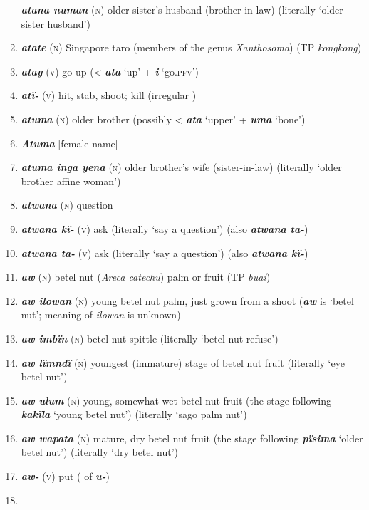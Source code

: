\begin{enumerate}[noitemsep, label={}, align=left, widest=190, labelsep=1ex,leftmargin=*,itemindent=-10pt]
\textbf{\textit{atana numan}} (\textsc{n}) older sister’s husband (brother-in-law) (literally ‘older sister husband’) \item 
\textbf{\textit{atate}} (\textsc{n}) Singapore taro (members of the genus \textit{Xanthosoma}) (TP \textit{kongkong}) \item 
\textbf{\textit{atay}} (\textsc{v}) go up (< \textbf{\textit{ata}} ‘up’ + \textbf{\textit{i}} ‘go.\textsc{pfv}’) \item 
\textbf{\textit{atï-}} (\textsc{v}) hit, stab, shoot; kill (irregular  ) \item 
\textbf{\textit{atuma}} (\textsc{n}) older brother (possibly < \textbf{\textit{ata}} ‘upper’ + \textbf{\textit{uma}} ‘bone’) \item 
\textbf{\textit{Atuma}} [female name] \item 
\textbf{\textit{atuma inga yena}} (\textsc{n}) older brother’s wife (sister-in-law) (literally ‘older brother affine woman’) \item 
\textbf{\textit{atwana}} (\textsc{n}) question \item 
\textbf{\textit{atwana kï-}} (\textsc{v}) ask (literally ‘say a question’) (also \textit{\textbf{atwana ta-}}) \item 
\textbf{\textit{atwana ta-}} (\textsc{v}) ask (literally ‘say a question’) (also \textit{\textbf{atwana kï-}}) \item 
\textbf{\textit{aw}} (\textsc{n}) betel nut (\textit{Areca catechu}) palm or fruit (TP \textit{buai}) \item 
\textbf{\textit{aw ilowan}} (\textsc{n}) young betel nut palm, just grown from a shoot (\textbf{\textit{aw}} is ‘betel nut’; meaning of \textit{ilowan} is unknown) \item 
\textbf{\textit{aw imbïn}} (\textsc{n}) betel nut spittle (literally ‘betel nut refuse’) \item 
\textbf{\textit{aw lïmndï}} (\textsc{n}) youngest (immature) stage of betel nut fruit (literally ‘eye betel nut’) \item 
\textbf{\textit{aw ulum}} (\textsc{n}) young, somewhat wet betel nut fruit (the stage following \textbf{\textit{kakïla}} ‘young betel nut’) (literally ‘sago palm nut’) \item 
\textbf{\textit{aw wapata}} (\textsc{n}) mature, dry betel nut fruit (the stage following \textbf{\textit{pïsima}} ‘older betel nut’) (literally ‘dry betel nut’) \item 
\textbf{\textit{aw-}} (\textsc{v}) put (  of \textbf{\textit{u-}}) \item 

\end{enumerate}
